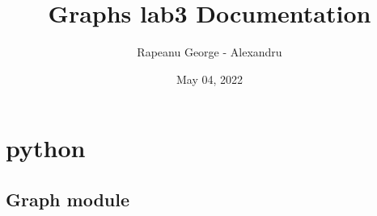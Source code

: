 \documentclass[letterpaper,10pt,english]{sphinxmanual}
\title{Graphs lab3 Documentation}
\date{May 04, 2022}
\author{Rapeanu George - Alexandru}
\begin{document}
\pagestyle{empty}
\sphinxmaketitle
\pagestyle{plain}
\sphinxtableofcontents
\pagestyle{normal}
\label{\detokenize{index::doc}}



\chapter{python}
\label{\detokenize{modules:python}}\label{\detokenize{modules::doc}}

\section{Graph module}
\label{\detokenize{Graph:module-Graph}}\label{\detokenize{Graph:graph-module}}\label{\detokenize{Graph::doc}}
\end{document}
